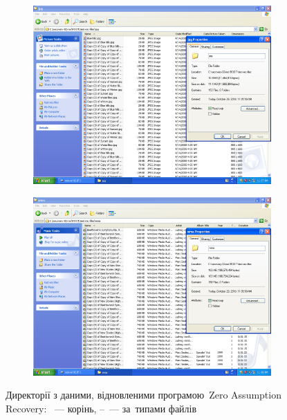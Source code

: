 \documentclass[
	a4paper,
	oneside,
	DIV = 12,
	fontsize = 13pt,
	headings = normal,
]{scrartcl}
\begin{document}
\begin{figure}
\begin{subfigure}{0.5\columnwidth}
				\includegraphics[height = 9\baselineskip]{./assets/y03s01-pcdiag-lab-03-p17.png}
				\caption{}
				\label{subfig:05-03-dll}
			\end{subfigure}%
			\begin{subfigure}{0.5\columnwidth}
				\centering
				\includegraphics[height = 9\baselineskip]{./assets/y03s01-pcdiag-lab-03-p18.png}
				\caption{}
				\label{subfig:05-04-wav}
			\end{subfigure}%
			\caption{Директорії з даними, відновленими програмою~\textenglish{Zero Assumption Recovery}: ~— корінь, –~— за~типами файлів}
			\label{fig:05-zar-recovery-res}
		\end{figure}
\end{document}
